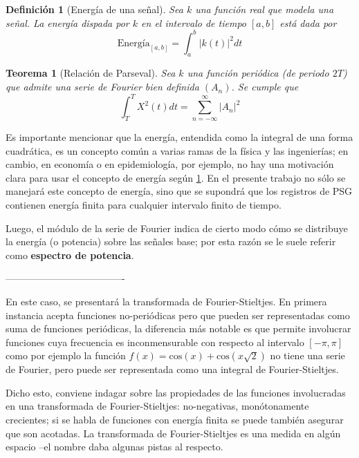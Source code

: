 \documentclass[12pt,a4paper]{mitthesis}
\newtheorem{defn}{Definici\'on}
\newtheorem{thrm}{Teorema}
\newcommand{\COS}[1]{\mathrm{cos}\left( #1 \right)}
\newcommand{\abso}[1]{\left| #1 \right|}
\begin{document}
\begin{defn}[Energ\'ia de una se\~nal]
Sea $k$ una funci\'on real que modela una se\~nal. La energ\'ia dispada por $k$ en el intervalo de
tiempo $[a,b]$ est\'a dada por
\begin{equation*}
\text{Energ\'ia}_{[a,b]} = 
\int_{a}^{b} \abso{k\left(t\right)}^{2} dt
\end{equation*}
\label{energia}
\end{defn}

\begin{thrm}[Relaci\'on de Parseval]
Sea $k$ una funci\'on peri\'odica (de periodo $2T$) que admite una serie de Fourier bien definida
$(A_n)$. Se cumple que
\begin{equation*}
\int_T^{T} X^{2}(t) dt = \sum_{n=-\infty}^{\infty} \abso{A_n}^{2}
\end{equation*}
\label{parseval_serie}
\end{thrm}

Es importante mencionar que la energ\'ia, entendida como la integral de una forma cuadr\'atica, es 
un concepto com\'un a varias ramas de la f\'isica y las ingenier\'ias; en cambio, en econom\'ia o 
en epidemiolog\'ia, por ejemplo, no hay una motivaci\'on clara para usar el concepto de energ\'ia 
seg\'un \ref{energia}.
En el presente trabajo no s\'olo se manejar\'a este concepto de energ\'ia, sino que se supondr\'a
que los registros de PSG contienen energ\'ia finita para cualquier intervalo finito de tiempo.

Luego, el m\'odulo de la serie de Fourier indica de cierto modo c\'omo se distribuye la energ\'ia 
(o potencia) sobre las se\~nales base; por esta raz\'on se le suele referir como \textbf{espectro 
de potencia}.

-------------------------------------

En este caso, se presentar\'a la transformada de Fourier-Stieltjes. En primera instancia acepta 
funciones no-peri\'odicas pero que pueden ser representadas como suma de funciones peri\'odicas, la 
diferencia m\'as notable es que permite involucrar funciones cuya frecuencia es inconmensurable con 
respecto al intervalo $[-\pi,\pi]$ como por ejemplo la funci\'on $f(x) = \COS{x} + \COS{x\sqrt{2}}$
no tiene una serie de Fourier, pero puede ser representada como una integral de Fourier-Stieltjes.

Dicho esto, conviene indagar sobre las propiedades de las funciones involucradas en una 
transformada de Fourier-Stieltjes: no-negativas, monótonamente crecientes; si se habla de funciones
con energ\'ia finita se puede tambi\'en asegurar que son acotadas. La transformada de 
Fourier-Stieltjes es una medida en alg\'un espacio --el nombre daba algunas pistas al respecto. 
\end{document}
